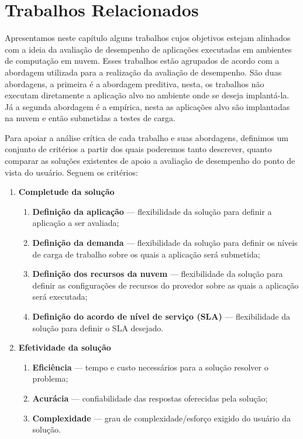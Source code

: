 \chapter[Trabalhos Relacionados]{Trabalhos Relacionados}
Apresentamos  neste capítulo alguns trabalhos cujos objetivos estejam alinhados 
com a ideia da avaliação de desempenho de aplicações executadas em ambientes de
computação em nuvem. Esses trabalhos estão agrupados de acordo com a abordagem utilizada para a realização da avaliação de desempenho. São duas abordagens, a primeira é a abordagem preditiva, nesta, os trabalhos não executam diretamente a aplicação alvo no ambiente onde se deseja implantá-la. Já a segunda abordagem é a empírica, nesta as aplicações alvo são implantadas na nuvem e então submetidas a testes de carga. 

Para apoiar a análise crítica de cada trabalho e suas abordagens, definimos um conjunto de critérios a partir dos quais poderemos tanto descrever, quanto comparar as soluções existentes de apoio a avaliação de desempenho do ponto de vista do usuário. Seguem os critérios:

\begin{enumerate}
  \item \textbf{Completude da solução}
  \begin{enumerate}
    \item \textbf{Definição da aplicação} --- flexibilidade da solução para
    definir a aplicação a ser avaliada;
    \item \textbf{Definição da demanda} --- flexibilidade da solução para
    definir os níveis de carga de trabalho sobre os quais a aplicação será
    submetida;
	\item \textbf{Definição dos recursos da nuvem} --- flexibilidade da solução
	para definir as configurações de recursos do provedor sobre as quais a aplicação
	será executada;
	\item \textbf{Definição do acordo de nível de serviço (SLA)} --- flexibilidade
	da solução para definir o SLA desejado.
  \end{enumerate}
  \item \textbf{Efetividade da solução}  
  \begin{enumerate}
    \item \textbf{Eficiência} --- tempo e custo necessários para a solução
    resolver o problema;
    \item \textbf{Acurácia} --- confiabilidade das respostas oferecidas pela
    solução;
	\item \textbf{Complexidade} --- grau de complexidade/esforço exigido do usuário
	da solução.
  \end{enumerate}
\end{enumerate}

